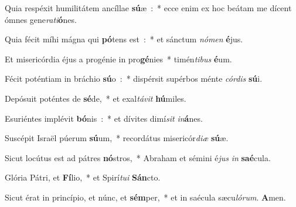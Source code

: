 ﻿\item Quia respéxit humilitátem ancíllae \textbf{sú}\-æ~:~* ecce enim ex hoc beátam me dícent ómnes gene\emph{ra}\-\emph{ti}\-\textbf{ó}\-nes.
\item Quia fécit míhi mágna qui \textbf{pó}\-tens est~:~* et sánctum \emph{nó}\-\emph{men} \textbf{é}\-jus.
\item Et misericórdia éjus a progénie in pro\textbf{gé}\-nies~* timén\emph{ti}\-\emph{bus} \textbf{é}\-um.
\item Fécit poténtiam in bráchio \textbf{sú}\-o~:~* dispérsit supérbos ménte \emph{cór}\-\emph{dis} \textbf{sú}\-i.
\item Depósuit poténtes de \textbf{sé}\-de,~* et exal\emph{tá}\-\emph{vit} \textbf{hú}\-miles.
\item Esuriéntes implévit \textbf{bó}\-nis~:~* et dívites dimí\emph{sit} \emph{in}\-\textbf{á}\-nes.
\item Suscépit Israël púerum \textbf{sú}\-um,~* recordátus misericór\emph{di}\-\emph{æ} \textbf{sú}\-æ.
\item Sicut locútus est ad pátres \textbf{nó}\-stros,~* Abraham et sémini é\emph{jus} \emph{in} \textbf{saé}\-cula.
\item Glória Pátri, et \textbf{Fí}\-lio,~* et Spirí\emph{tu}\-\emph{i} \textbf{Sán}\-cto.
\item Sicut érat in princípio, et núnc, et \textbf{sém}\-per,~* et in saécula sæcu\emph{ló}\-\emph{rum}. \textbf{A}\-men.
